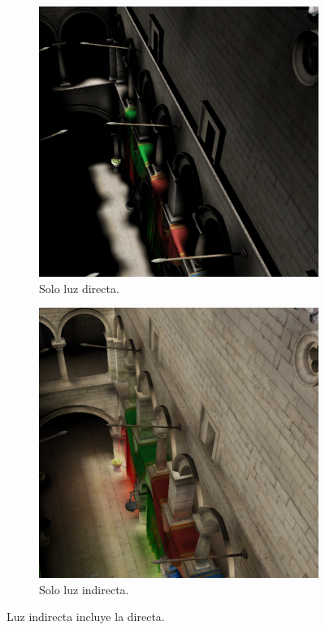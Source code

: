 \begin{figure}[h]
    \begin{center}
    \begin{subfigure}{.49\textwidth}
        \includegraphics[width=\textwidth]{indirect-grabs-direct-1.png}
        \caption{Solo luz directa.}
    \end{subfigure}
    \begin{subfigure}{.49\textwidth}
        \includegraphics[width=\textwidth]{indirect-grabs-direct-2.png}
        \caption{Solo luz indirecta.}
    \end{subfigure}
    \caption{Luz indirecta incluye la directa.}
    \label{fig:indirect-grabs-direct}
    \end{center}
\end{figure}

